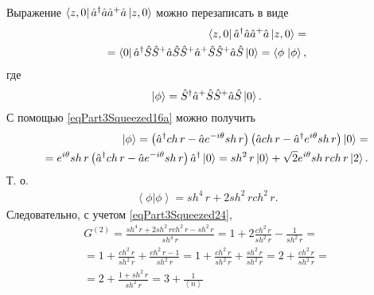 Выражение
$\bra{z,0}\hat{a}^{\dag}\hat{a}\hat{a}^{+}\hat{a}\ket{z,0}$
можно перезаписать в виде
\begin{eqnarray}
  \bra{z,0}\hat{a}^{\dag}\hat{a}\hat{a}^{+}\hat{a}\ket{z,0}
  = \nonumber \\
  =
  \bra{0}\hat{a}^{\dag}\hat{S}\hat{S}^{+}\hat{a}\hat{S}\hat{S}^{+}\hat{a}^{+}\hat{S}\hat{S}^{+}\hat{a}\hat{S}\ket{0}
  = \left<\phi\right.\left|\phi\right>,
  \nonumber
\end{eqnarray}
где
\[
\left|\phi\right> = \hat{S}^{\dag}\hat{a}^{+}\hat{S}\hat{S}^{+}\hat{a}\hat{S}\ket{0}.
\]
С помощью \eqref{eqPart3Squeezed16a} можно получить
\begin{eqnarray}
  \left|\phi\right> =  
  \left(\hat{a}^{\dag} ch\,r - \hat{a} e^{-i\theta} sh \, r\right)
  \left(\hat{a} ch\,r - \hat{a}^{\dag} e^{i\theta} sh \, r\right)
  \ket{0} =
  \nonumber \\
  =
   e^{i\theta} sh \, r \left(\hat{a}^{\dag} ch\,r - \hat{a} e^{-i\theta} sh \, r\right)
   \hat{a}^{\dag}\ket{0} =
   sh^2 \, r \ket{0} + \sqrt{2} e^{i\theta}  sh \, r ch \, r\ket{2}.
  \nonumber
\end{eqnarray}
Т. о.
\begin{eqnarray}
  \left<\phi\right.\left|\phi\right> =
  sh^4 \, r + 2 sh^2 \, r ch^2 \, r.
  \nonumber
\end{eqnarray}
Следовательно, с учетом \eqref{eqPart3Squeezed24},
\begin{eqnarray}
G^{(2)} = \frac{sh^4 \, r + 2 sh^2 \, r ch^2 \, r - sh^2 \, r}{sh^4 \,
  r} = 1 + 2 \frac{ch^2 \, r}{sh^2 \, r} - \frac{1}{sh^2 \, r} =
\nonumber \\
=
1 + \frac{ch^2 \, r}{sh^2 \, r} + \frac{ch^2 \, r - 1}{sh^2 \, r} =
1 + \frac{ch^2 \, r}{sh^2 \, r} + \frac{sh^2 \, r }{sh^2 \, r} =
2 + \frac{ch^2 \, r}{sh^2 \, r} =
\nonumber \\
= 2 + \frac{1 + sh^2 \, r}{sh^2 \, r} = 3 + \frac{1}{\left<n\right>}
\nonumber
\end{eqnarray}

